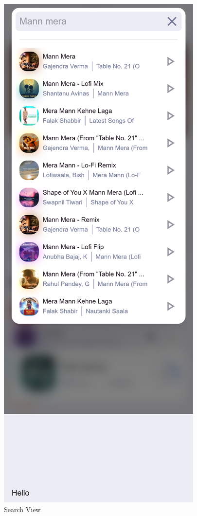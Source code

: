 \begin{figure}[H]
  \caption{Search View}
  \includegraphics[scale=.2]{./screenshot2.png}

\end{figure}
